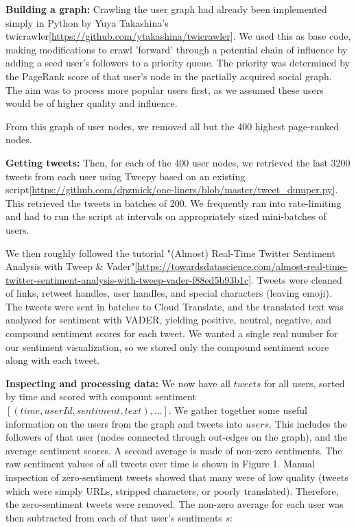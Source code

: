\documentclass[12pt]{article}
\begin{document}
\textbf{Building a graph:} Crawling the user graph had already been implemented simply in Python by Yuya Takashina's twicrawler[\url{https://github.com/ytakashina/twicrawler}]. We used this as base code, making modifications to crawl 'forward' through a potential chain of influence by adding a seed user's followers to a priority queue. The priority was determined by the PageRank score of that user's node in the partially acquired social graph. The aim was to process more popular users first, as we assumed these users would be of higher quality and influence.

From this graph of user nodes, we removed all but the 400 highest page-ranked nodes.\newline

\textbf{Getting tweets:} Then, for each of the 400 user nodes, we retrieved the last 3200 tweets from each user using Tweepy based on an existing script[\url{https://github.com/dpzmick/one-liners/blob/master/tweet_dumper.py}]. This retrieved the tweets in batches of 200. We frequently ran into rate-limiting and had to run the script at intervals on appropriately sized mini-batches of users.\newline

We then roughly followed the tutorial "(Almost) Real-Time Twitter Sentiment Analysis with Tweep \& Vader"[\url{https://towardsdatascience.com/almost-real-time-twitter-sentiment-analysis-with-tweep-vader-f88ed5b93b1c}]. Tweets were cleaned of links, retweet handles, user handles, and special characters (leaving emoji). The tweets were sent in batches to Cloud Translate, and the translated text was analysed for sentiment with VADER, yielding positive, neutral, negative, and compound sentiment scores for each tweet. We wanted a single real number for our sentiment visualization, so we stored only the compound sentiment score along with each tweet.\newline

\textbf{Inspecting and processing data:} We now have all $tweets$ for all users, sorted by time and scored with compount sentiment $[(time, userId, sentiment, text), \dots]$. We gather together some useful information on the users from the graph and tweets into $users$. This includes the followers of that user (nodes connected through out-edges on the graph), and the average sentiment scores. A second average is made of non-zero sentiments.\newline
The raw sentiment values of all tweets over time is shown in Figure 1. Manual inspection of zero-sentiment tweets showed that many were of low quality (tweets which were simply URLs, stripped characters, or poorly translated). Therefore, the zero-sentiment tweets were removed. The non-zero average for each user was then subtracted from each of that user's sentiments $s$:
\end{document}
